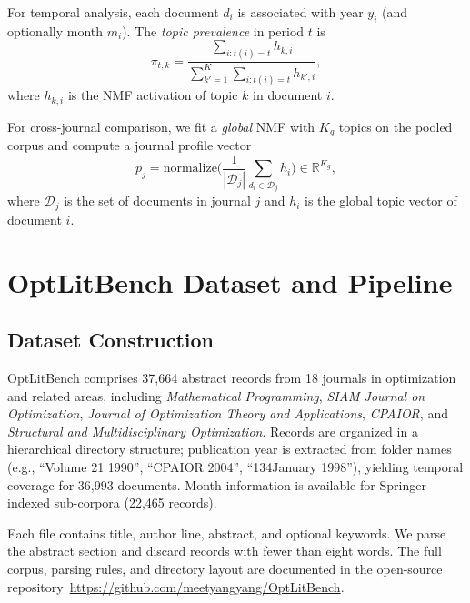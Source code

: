 \documentclass[conference]{IEEEtran}
\newcommand{\repo}{\url{https://github.com/meetyangyang/OptLitBench}}
\begin{document}
For temporal analysis, each document $d_i$ is associated with year $y_i$ (and optionally month $m_i$).
The \emph{topic prevalence} in period $t$ is
\begin{equation}
\pi_{t,k}=\frac{\sum_{i: t(i)=t} h_{k,i}}{\sum_{k'=1}^{K}\sum_{i: t(i)=t} h_{k',i}},
\label{eq:prev}
\end{equation}
where $h_{k,i}$ is the NMF activation of topic $k$ in document $i$.

For cross-journal comparison, we fit a \emph{global} NMF with $K_g$ topics on the pooled corpus and compute a journal profile vector
\begin{equation}
p_j=\mathrm{normalize}\Big(\frac{1}{|\mathcal{D}_j|}\sum_{d_i\in\mathcal{D}_j} h_i\Big)\in\mathbb{R}^{K_g},
\label{eq:profile}
\end{equation}
where $\mathcal{D}_j$ is the set of documents in journal $j$ and $h_i$ is the global topic vector of document $i$.

\section{OptLitBench Dataset and Pipeline}
\label{sec:pipeline}

\subsection{Dataset Construction}
OptLitBench comprises 37,664 abstract records from 18 journals in optimization and related areas, including \emph{Mathematical Programming}, \emph{SIAM Journal on Optimization}, \emph{Journal of Optimization Theory and Applications}, \emph{CPAIOR}, and \emph{Structural and Multidisciplinary Optimization}.
Records are organized in a hierarchical directory structure; publication year is extracted from folder names (e.g., ``Volume 21 1990'', ``CPAIOR 2004'', ``134January 1998''), yielding temporal coverage for 36,993 documents.
Month information is available for Springer-indexed sub-corpora (22,465 records).

Each file contains title, author line, abstract, and optional keywords.
We parse the abstract section and discard records with fewer than eight words.
The full corpus, parsing rules, and directory layout are documented in the open-source repository~\repo{}.
\end{document}
